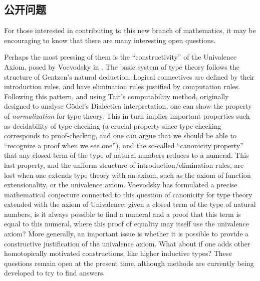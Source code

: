 %

\subsection*{公开问题} 

%

For those interested in contributing to this new branch of mathematics, it may be encouraging to know that there are many interesting open questions.

%
Perhaps the most pressing of them is the ``constructivity'' of the Univalence Axiom, posed by Voevodsky in \cite{Universe-poly}.
The basic system of type theory follows the structure of Gentzen's natural deduction. Logical connectives are defined by their introduction rules, and have elimination rules justified by computation rules. Following this pattern, and using Tait's computability method, originally designed to analyse G\"odel's Dialectica interpretation, one can show the property of \emph{normalization} for type theory. This in turn implies important properties such as decidability of type-checking (a crucial property since type-checking corresponds to proof-checking, and one can argue that we should be able to ``recognize a proof when we see one''), and the so-called ``canonicity property'' that any closed term of the type of natural numbers reduces to a numeral. This last property, and the uniform structure of introduction/elimination rules, are lost when one extends type theory with an axiom, such as the axiom of function extensionality, or the univalence axiom. Voevodsky has formulated a precise mathematical conjecture connected to this question of canonicity for type theory extended with the axiom of Univalence: given a closed term of the type of natural numbers, is it always possible to find a numeral and a proof that this term is equal to this numeral, where this proof of equality may itself use the univalence axiom? More generally, an important issue is whether it is possible to provide a constructive justification of the univalence axiom.
What about if one adds other homotopically motivated constructions, like higher inductive types?
These questions remain open at the present time, although methods are currently being developed to try to find answers.

